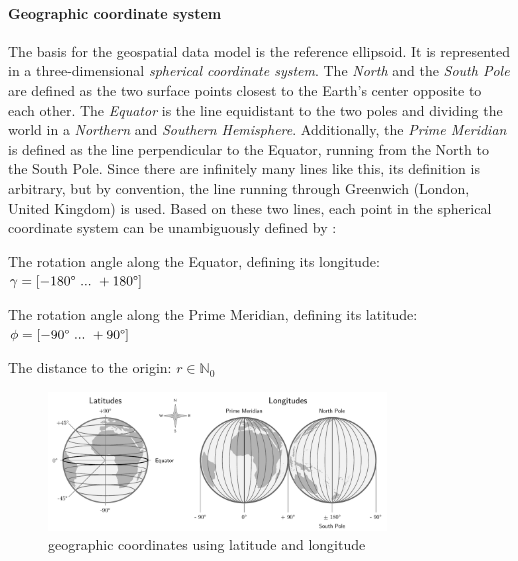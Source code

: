 
\paragraph{Geographic coordinate system} %
\label{ssub:geographic_coordinate_system}

The basis for the geospatial data model is the reference ellipsoid. It is represented in a three-dimensional \emph{spherical coordinate system}. The \emph{North} and the \emph{South Pole} are defined as the two surface points closest to the Earth's center opposite to each other. The \emph{Equator} is the line equidistant to the two poles and dividing the world in a \emph{Northern} and \emph{Southern Hemisphere}. Additionally, the \emph{Prime Meridian} is defined as the line perpendicular to the Equator, running from the North to the South Pole. Since there are infinitely many lines like this, its definition is arbitrary, but by convention, the line running through Greenwich (London, United Kingdom) is used. Based on these two lines, each point in the spherical coordinate system can be unambiguously defined by
\cite[pp. 26-28]{bolstad2008gis}:

\begin{compactenum}
  \item The rotation angle along the Equator, defining its longitude: $\gamma = [-180\degree ~...~ +180\degree]$
  \item The rotation angle along the Prime Meridian, defining its latitude: $\phi = [-90\degree ~...~ +90\degree]$
  \item The distance to the origin: $r \in \mathbb{N}_0$
\end{compactenum}

\begin{figure}[ht]
  \vspace{1em}
  \centering
  \includegraphics[width=0.8\textwidth]{graphics/basics/geo_coordinates}
  \caption{geographic coordinates using latitude and longitude}
  \label{fig:geo-coordinates}
\end{figure}

